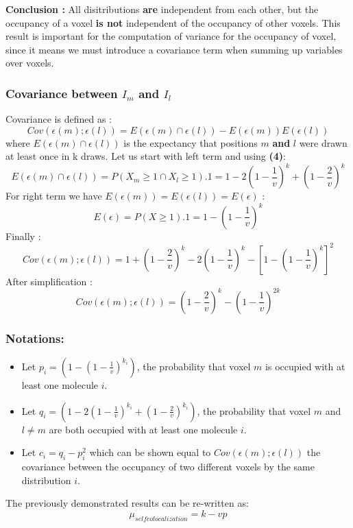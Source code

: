 \documentclass{article}
\begin{document}
\textbf{Conclusion : }All disitributions \textbf{are} independent from each other, but the occupancy of a voxel \textbf{is not} independent of the
occupancy of other voxels. This result is important for the computation of variance for the occupancy of voxel, since it means we must introduce a 
covariance term when summing up variables over voxels.


\subsubsection{Covariance between $I_m$ and $I_l$}

Covariance is defined as :
\[
    Cov(\epsilon(m);\epsilon(l)) = E(\epsilon(m) \cap \epsilon(l)) - E(\epsilon(m))E(\epsilon(l))
\]
where $E(\epsilon(m) \cap \epsilon(l))$ is the expectancy that positions $m$ \textbf{and} $l$ were drawn at least once in k draws. Let us start with left term  and 
using \textbf{(4)}:
\[
    E(\epsilon(m) \cap \epsilon(l)) = P(X_m \geq 1 \cap X_l \geq 1).1 = 1 - 2(1-\frac{1}{v})^{k} + (1-\frac{2}{v})^{k}
\]
For right term we have $E(\epsilon(m)) = E(\epsilon(l)) = E(\epsilon)$ :
\[
E(\epsilon) = P(X\geq1).1 = 1-(1 - \frac{1}{v})^k
\]
Finally :
\[
    Cov(\epsilon(m);\epsilon(l)) =  1 + (1-\frac{2}{v})^{k} - 2(1-\frac{1}{v})^{k} - [1-(1 - \frac{1}{v})^k]^2
\]
After simplification :
\begin{equation}
    Cov(\epsilon(m);\epsilon(l)) = (1-\frac{2}{v})^k - (1-\frac{1}{v})^{2k}
\end{equation}

\subsubsection*{Notations:}
\begin{itemize}
    \item Let $p_i = (1-{(1-\frac{1}{v})}^{k_i})$, the probability that voxel $m$ is occupied with at least one molecule $i$.
    \item Let $q_i = (1-2{(1-\frac{1}{v})}^{k_i} + {(1-\frac{2}{v})}^{k_i})$, the probability that voxel $m$ and $l\neq m$ are both occupied with at least
    one molecule $i$.
    \item Let $c_i = q_i - p_i^2$ which can be shown equal to $Cov(\epsilon(m);\epsilon(l))$ the covariance between the occupancy of two different voxels by the same distribution $i$.
\end{itemize}

The previously demonstrated results can be re-written as:
\[
\mu_{self colocalization} = k - vp
\]
\end{document}
